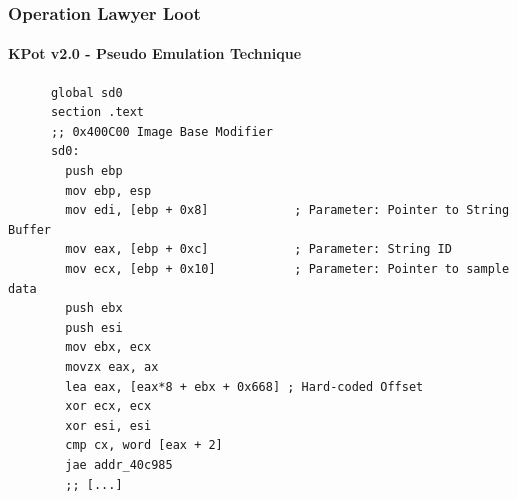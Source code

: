 \documentclass[aspectratio=169]{beamer}
\begin{document}
{
\begin{frame}[fragile]{}
  \frametitle{Operation Lawyer Loot}
  \framesubtitle{KPot v2.0 - Pseudo Emulation Technique}
  \begin{tcolorbox}[title=KPot v2.0 - String Decryptor Pseudo Emulation Code,colback=black]
    \begin{verbatim}
      global sd0
      section .text
      ;; 0x400C00 Image Base Modifier
      sd0:
        push ebp
        mov ebp, esp
        mov edi, [ebp + 0x8]            ; Parameter: Pointer to String Buffer
        mov eax, [ebp + 0xc]            ; Parameter: String ID
        mov ecx, [ebp + 0x10]           ; Parameter: Pointer to sample data
        push ebx
        push esi
        mov ebx, ecx
        movzx eax, ax
        lea eax, [eax*8 + ebx + 0x668] ; Hard-coded Offset
        xor ecx, ecx
        xor esi, esi
        cmp cx, word [eax + 2]
        jae addr_40c985
        ;; [...]
    \end{verbatim}
  \end{tcolorbox}
\end{frame}
}
\end{document}
